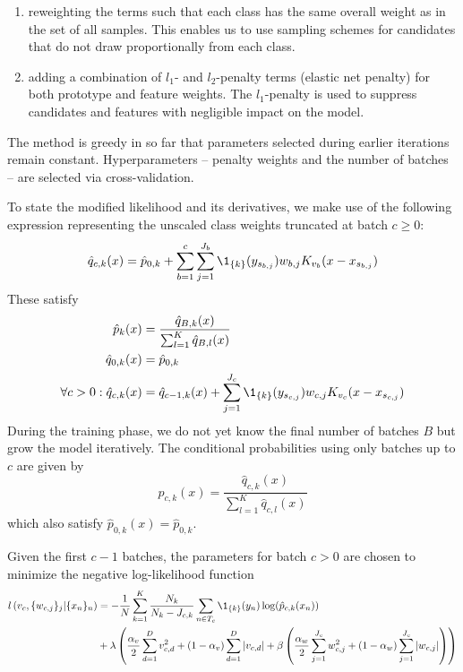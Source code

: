 %
\begin{enumerate}
\item reweighting the terms such that each class has the same overall weight as in the set of all samples.
This enables us to use sampling schemes for candidates that do not draw proportionally from each class.
%
\item adding a combination of $l_1$- and $l_2$-penalty terms (elastic net penalty) for both prototype and feature weights.
The $l_1$-penalty is used to suppress candidates and features with negligible impact on the model.
\end{enumerate}
%
The method is greedy in so far that parameters selected during earlier iterations remain constant.
Hyperparameters -- penalty weights and the number of batches -- are selected via cross-validation.\par
%
To state the modified likelihood and its derivatives, we make use of the following expression representing the unscaled class weights truncated at batch $c\geq0$:
%
\begin{equation}
\hat{q}_{c,k}(x)=\hat{p}_{0,k}
+\sum_{b=1}^c\sum_{j=1}^{J_b}\1_{\{k\}}(y_{s_{b,j}})w_{b,j}K_{v_b}(x-x_{s_{b,j}})
\label{eq_qckx}
\end{equation}
%
These satisfy
%
\begin{align}
\hat{p}_{k}(x)&=\frac{\hat{q}_{B,k}(x)}{\sum_{l=1}^K\hat{q}_{B,l}(x)}\label{eq_q_properties}\\
\hat{q}_{0,k}(x)&=\hat{p}_{0,k}\notag\\
\forall c>0:\hat{q}_{c,k}(x)&
=\hat{q}_{c-1,k}(x)+\sum_{j=1}^{J_c}\1_{\{k\}}(y_{s_{c,j}})w_{c,j}K_{v_c}(x-x_{s_{c,j}})
\notag
\end{align}
%
During the training phase, we do not yet know the final number of batches $B$ but grow the model iteratively.
The conditional probabilities using only batches up to $c$ are given by
%
\begin{equation}
\hat{p}_{c,k}(x)=\frac{\hat{q}_{c,k}(x)}{\sum_{l=1}^K\hat{q}_{c,l}(x)}\label{eq_pckx}
\end{equation}
%
which also satisfy $\hat{p}_{0,k}(x)=\hat{p}_{0,k}$.\par
%
Given the first $c-1$ batches, the parameters for batch $c>0$ are chosen to minimize the negative log-likelihood function
%
\begin{align}
l\left(v_c,\{w_{c,j}\}_j|\{x_n\}_n\right)
&=-\frac{1}{N}\sum_{k=1}^K\frac{N_k}{N_k-J_{c,k}}\sum_{n\in T_c}
\1_{\{k\}}(y_n)\log(\hat{p}_{c,k}(x_n))\label{eq_log_likelihood}\\
&+\lambda\left(\frac{\alpha_v}{2}\sum_{d=1}^Dv_{c,d}^2
+(1-\alpha_v)\sum_{d=1}^D|v_{c,d}|
+\beta\left(\frac{\alpha_w}{2}\sum_{j=1}^{J_c}w_{c,j}^2
+(1-\alpha_w)\sum_{j=1}^{J_c}|w_{c,j}|\right)\right)\notag
\end{align}
